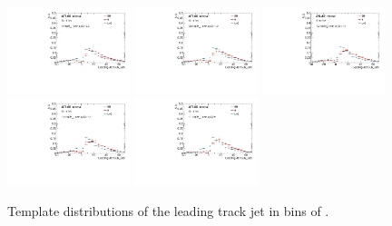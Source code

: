 \begin{figure}[htbp]
  \centering
 \includegraphics[width=0.32\textwidth]{figures/gbb/Sub_Sd0_Fits/Canv_FitTemplate_-3-logM_bb_over_p_TG--22_LpT_INF_SpT_INF_x.pdf}
 \includegraphics[width=0.32\textwidth]{figures/gbb/Sub_Sd0_Fits/Canv_FitTemplate_-22-logM_bb_over_p_TG--19_LpT_INF_SpT_INF_x.pdf}
 \includegraphics[width=0.32\textwidth]{figures/gbb/Sub_Sd0_Fits/Canv_FitTemplate_-19-logM_bb_over_p_TG--15_LpT_INF_SpT_INF_x.pdf}\\
 \includegraphics[width=0.32\textwidth]{figures/gbb/Sub_Sd0_Fits/Canv_FitTemplate_-15-logM_bb_over_p_TG--11_LpT_INF_SpT_INF_x.pdf}
 \includegraphics[width=0.32\textwidth]{figures/gbb/Sub_Sd0_Fits/Canv_FitTemplate_-11-logM_bb_over_p_TG-0_LpT_INF_SpT_INF_x.pdf}

\caption{Template \subsdzero distributions of the leading track jet in bins of \mpt. }
  \label{fig:fracmasspt-template-leading}
\end{figure}


